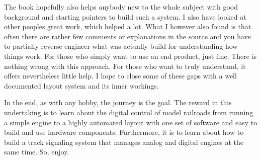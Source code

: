 The book hopefully also helps anybody new to the whole subject with good background and starting pointers to build such a system. I also have looked at other peoples great work, which helped a lot. What I however also found is that often there are rather few comments or explanations in the source and you have to partially reverse engineer what was actually build for understanding how things work. For those who simply want to use an end product, just fine. There is nothing wrong with this approach. For those who want to truly understand, it offers nevertheless little help. I hope to close some of these gaps with a well documented layout system and its inner workings.

In the end, as with any hobby, the journey is the goal. The reward in this undertaking is to learn about the digital control of model railroads from running a simple engine to a highly automated layout with one set of software and easy to build and use hardware components. Furthermore, it is to learn about how to build a track signaling system that manages analog and digital engines at the same time. So, enjoy.



